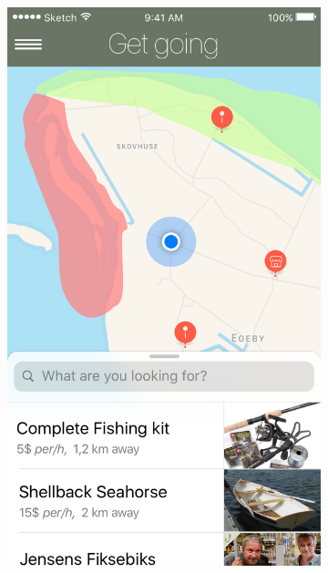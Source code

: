 \begin{figure}[H]
\begin{subfigure}[t]{0.23\textwidth}
  	  \includegraphics[width=\textwidth]{images/Map.png}
  \end{subfigure}
  \hfill
  \begin{subfigure}[t]{0.23\textwidth}
  	  \centering

\end{subfigure}
\end{figure}
